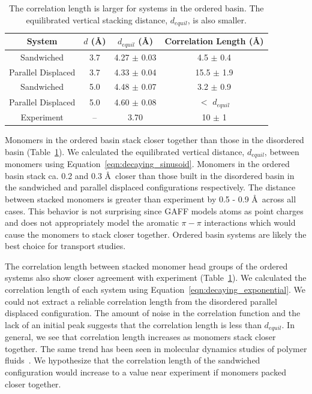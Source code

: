 \documentclass[journal=jpcbfk,manusciprt=article]{achemso}
\begin{document}
  \begin{table}[h]
  \centering
  \begin{tabular}{cccc}
  \toprule
  System             & $\mathit{d}$ (\AA) & $\mathit{d}_{equil}$ (\AA) & Correlation Length (\AA) \\
  \midrule
  Sandwiched         & 3.7                &    4.27 $\pm$ 0.03         & 4.5 $\pm$ 0.4            \\
  Parallel Displaced & 3.7                &    4.33 $\pm$ 0.04         & 15.5 $\pm$ 1.9           \\ 
  Sandwiched         & 5.0                &    4.48 $\pm$ 0.07         & 3.2 $\pm$ 0.9            \\
  Parallel Displaced & 5.0                &    4.60 $\pm$ 0.08         & $<$ $\mathit{d}_{equil}$ \\ 
  Experiment         & --                 &    3.70                    & 10 $\pm$ 1               \\
  \bottomrule
  \end{tabular}
  \caption{The correlation length is larger for systems in the ordered basin. The equilibrated vertical
  stacking distance, $\mathit{d}_{equil}$, is also smaller.}
  \label{table:correlation_length}
  \end{table}
  
  Monomers in the ordered basin stack closer together than those in the disordered basin
  (Table~\ref{table:correlation_length}). We calculated the equilibrated vertical distance,
  $\mathit{d}_{equil}$, between monomers using Equation~\ref{eqn:decaying_sinusoid}. 
  Monomers in the ordered basin stack ca. 0.2 and 0.3 \AA~closer than those built in the 
  disordered basin in the sandwiched and parallel displaced configurations respectively. 
  The distance between stacked monomers is greater than experiment by 0.5 - 0.9 \AA~across all 
  cases. This behavior is not surprising since GAFF models atoms as point charges and does not 
  appropriately model the aromatic $\pi-\pi$ interactions which would cause the monomers to 
  stack closer together. Ordered basin systems are likely the best choice for transport studies.
  
  The correlation length between stacked monomer head groups of the ordered systems also show
  closer agreement with experiment (Table~\ref{table:correlation_length}). We calculated the 
  correlation length of each system using Equation~\ref{eqn:decaying_exponential}. We could
  not extract a reliable correlation length from the disordered parallel displaced configuration.
  The amount of noise in the correlation function and the lack of an initial peak suggests that 
  the correlation length is less than $\mathit{d}_{equil}$. In general, we see that correlation
  length increases as monomers stack closer together. The same trend has been seen in molecular
  dynamics studies of polymer fluids~\cite{koshy_density_2003}. We hypothesize that the correlation
  length of the sandwiched configuration would increase to a value near experiment if monomers
  packed closer together. 
  
\end{document}
